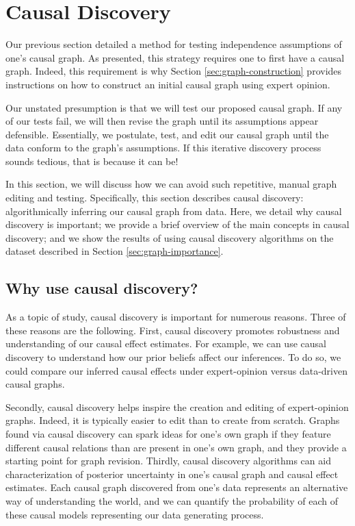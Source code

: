 \section{Causal Discovery}
\label{sec:causal-discovery}

Our previous section detailed a method for testing independence assumptions of one's causal graph.
As presented, this strategy requires one to first have a causal graph.
Indeed, this requirement is why Section \ref{sec:graph-construction} provides instructions on how to construct an initial causal graph using expert opinion.

Our unstated presumption is that we will test our proposed causal graph.
If any of our tests fail, we will then revise the graph until its assumptions appear defensible.
Essentially, we postulate, test, and edit our causal graph until the data conform to the graph's assumptions.
If this iterative discovery process sounds tedious, that is because it can be!

In this section, we will discuss how we can avoid such repetitive, manual graph editing and testing.
Specifically, this section describes causal discovery:
algorithmically inferring our causal graph from data.
Here, we detail why causal discovery is important;
we provide a brief overview of the main concepts in causal discovery;
and we show the results of using causal discovery algorithms on the dataset described in Section \ref{sec:graph-importance}.

\subsection{Why use causal discovery?}
\label{sec:why-causal-discovery}

As a topic of study, causal discovery is important for numerous reasons.
Three of these reasons are the following.
First, causal discovery promotes robustness and understanding of our causal effect estimates.
For example, we can use causal discovery to understand how our prior beliefs affect our inferences.
To do so, we could compare our inferred causal effects under expert-opinion versus data-driven causal graphs.

Secondly, causal discovery helps inspire the creation and editing of expert-opinion graphs.
Indeed, it is typically easier to edit than to create from scratch.
Graphs found via causal discovery can spark ideas for one's own graph if they feature different causal relations than are present in one's own graph, and they provide a starting point for graph revision.
Thirdly, causal discovery algorithms can aid characterization of posterior uncertainty in one's causal graph and causal effect estimates.
Each causal graph discovered from one's data represents an alternative way of understanding the world, and we can quantify the probability of each of these causal models representing our data generating process.

